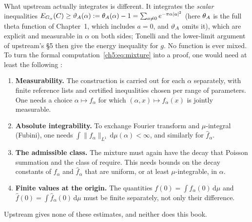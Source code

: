 What upstream actually integrates is different. It integrates the \emph{scalar} inequalities
$E_{G_\alpha}(C)\ge\vartheta_A(\alpha):=\theta_A(\alpha)-1=\sum_{a\ne0}e^{-\pi\alpha|a|^2}$ (here
$\theta_A$ is the full theta function of Chapter~1, which includes $a=0$, and $\vartheta_A$ omits it), which are explicit and measurable in
$\alpha$ on both sides; Tonelli and the lower-limit argument of upstream's \S5 then give the energy inequality for $g$.
No function is ever mixed. To turn the formal computation~\eqref{ch5:eq:mixture} into a proof, one would need at least
the following \tierC{}:
\begin{enumerate}[leftmargin=*]
\item \textbf{Measurability.} The construction is carried out for each $\alpha$ separately, with finite reference
  lists and certified inequalities chosen per range of parameters. One needs a choice $\alpha\mapsto f_\alpha$ for
  which $(\alpha,x)\mapsto f_\alpha(x)$ is jointly measurable.
\item \textbf{Absolute integrability.} To exchange Fourier transform and $\mu$-integral (Fubini), one needs
  $\int\|f_\alpha\|_{L^1}\,\mathrm{d}\mu(\alpha)<\infty$, and similarly for $\hat f_\alpha$.
\item \textbf{The admissible class.} The mixture must again have the decay that Poisson summation and the class of
  \cite[Conjecture~9.4]{ck} require. This needs bounds on the decay constants of $f_\alpha$ and $\hat f_\alpha$ that are uniform,
  or at least $\mu$-integrable, in $\alpha$.
\item \textbf{Finite values at the origin.} The quantities $f(0)=\int f_\alpha(0)\,\mathrm{d}\mu$ and
  $\hat f(0)=\int\hat f_\alpha(0)\,\mathrm{d}\mu$ must be finite separately, not only their difference.
\end{enumerate}
Upstream gives none of these estimates, and neither does this book.

